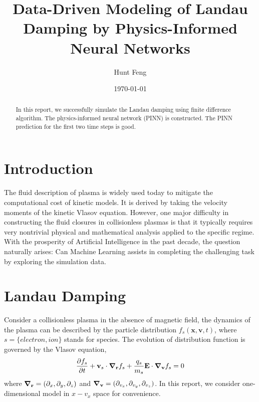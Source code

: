 \documentclass{article}
\title{Data-Driven Modeling of Landau Damping by Physics-Informed Neural Networks}
\author{Hunt Feng}
\date{\today}
\begin{document}
    \maketitle

    \begin{abstract}
        In this report, we successfully simulate the Landau damping using finite difference algorithm. The physics-informed neural network (PINN) is constructed. The PINN prediction for the first two time steps is good.
    \end{abstract}

    \section{Introduction}
    The fluid description of plasma is widely used today to mitigate the computational cost of kinetic models. It is derived by taking the velocity moments of the kinetic Vlasov equation. However, one major difficulty in constructing the fluid closures in collisionless plasmas is that it typically requires very nontrivial physical and mathematical analysis applied to the specific regime. With the prosperity of Artificial Intelligence in the past decade, the question naturally arises: Can Machine Learning assists in completing the challenging task by exploring the simulation data.
    
    \section{Landau Damping}
    Consider a collisionless plasma in the absence of magnetic field, the dynamics of the plasma can be described by the particle distribution $f_s(\mathbf{x},\mathbf{v},t)$, where $s=\{electron, ion\}$ stands for species. The evolution of distribution function is governed by the Vlasov equation,
    \begin{equation} \label{eq:vlasov}
        \pdv{f_s}{t} + \mathbf{v}_s\cdot \grad_\mathbf{r} f_s + \frac{q_s}{m_s}\mathbf{E}\cdot\grad_\mathbf{v} f_s = 0
    \end{equation}
    where $\grad_\mathbf{r}=(\partial_x, \partial_y, \partial_z)$ and $\grad_\mathbf{v}=(\partial_{v_x}, \partial_{v_y}, \partial_{v_z})$. In this report, we consider one-dimensional model in $x-v_x$ space for convenience. 
    
\end{document}
